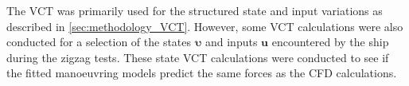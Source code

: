 The VCT was primarily used for the structured state and input variations as described in \autoref{sec:methodology_VCT}. However, some VCT calculations were also conducted for a selection of the states $\pmb{\bm{\upsilon}}$ and inputs $\mathbf{u}$ encountered by the ship during the zigzag tests. These state VCT calculations were conducted to see if the fitted manoeuvring models predict the same forces as the CFD calculations.